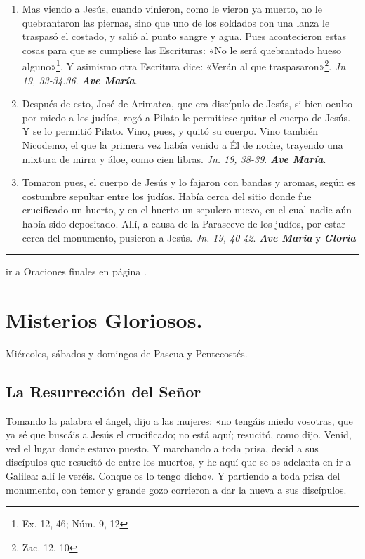 \documentclass[11pt,a4paper]{book}
\begin{document}
\begin{enumerate}
        \item Mas viendo a Jesús, cuando vinieron, como le vieron ya muerto, no le quebrantaron las piernas, sino que uno de los soldados 
            con una lanza le traspasó el costado, y salió al punto sangre y agua. Pues acontecieron estas cosas para que se cumpliese las
            Escrituras: «No le será quebrantado hueso alguno»\footnote{Ex. 12, 46; Núm. 9, 12}. Y asimismo otra Escritura dice: «Verán al que
            traspasaron»\footnote{Zac. 12, 10}. \emph{Jn 19, 33-34.36}. \textbf{\emph{Ave María}}.

        \item Después de esto, José de Arimatea, que era discípulo de Jesús, si bien oculto por miedo a los judíos, rogó a Pilato le permitiese
            quitar el cuerpo de Jesús. Y se lo permitió Pilato. Vino, pues, y quitó su cuerpo. Vino también Nicodemo, el que la primera vez había
            venido a Él de noche, trayendo una mixtura de mirra y áloe, como cien libras.
            \emph{Jn. 19, 38-39}. \textbf{\emph{Ave María}}.            

        \item Tomaron pues, el cuerpo de Jesús y lo fajaron con bandas y aromas, según es costumbre sepultar entre los judíos. Había cerca
            del sitio donde fue crucificado un huerto, y en el huerto un sepulcro nuevo, en el cual nadie aún había sido depositado.
            Allí, a causa de la Parasceve de los judíos, por estar cerca del monumento, pusieron a Jesús. 
            \emph{Jn. 19, 40-42}. \textbf{\emph{Ave María}} y \textbf{\emph{Gloria}}

    \end{enumerate}    

    \rule{\textwidth}{0.5pt}
    

    ir a Oraciones finales en página \pageref{sec:final-prayer}.

    \newpage

    \section*{Misterios Gloriosos.}
    Miércoles, sábados y domingos de Pascua y Pentecostés.

    \subsection*{La Resurrección del Señor}

    Tomando la palabra el ángel, dijo a las mujeres: «no tengáis miedo vosotras, que ya sé que buscáis a Jesús el crucificado; 
    no está aquí; resucitó, como dijo. Venid, ved el lugar donde estuvo puesto. Y marchando a toda prisa, 
    decid a sus discípulos que resucitó de entre los muertos, y he aquí que se os adelanta en ir a Galilea: allí le veréis. 
    Conque os lo tengo dicho». Y partiendo a toda prisa del monumento, con temor y grande gozo corrieron a dar la nueva a sus discípulos. 
\end{document}
